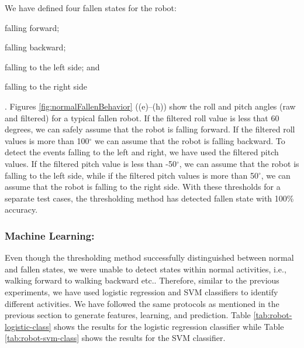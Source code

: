 \documentclass[letterpaper]{article}
\begin{document}
We have defined four fallen states for the robot: \begin{inparaenum}[(1)] \item falling
forward; \item falling backward; \item falling to the left side; and \item falling to the right
side\end{inparaenum}. Figures \ref{fig:normalFallenBehavior} ((e)--(h)) show the roll and pitch 
angles (raw and filtered) for a typical fallen robot. If the filtered roll value is less that 60 
degrees, we can safely assume that the robot is falling forward. If the filtered roll values is 
more than 100$^{\circ}$ we can assume that the robot is falling backward. To detect the events 
falling to the left and right, we have used the filtered pitch values. If the filtered pitch value 
is less than -50$^{\circ}$, we can assume that the robot is falling to the left side, while if the 
filtered pitch values is more than 50$^{\circ}$, we can assume that the robot is falling to the right 
side. With these thresholds for a separate test cases, the thresholding method has detected fallen 
state with 100\% accuracy. 

\subsubsection{Machine Learning:}
Even though the thresholding method successfully distinguished between normal and fallen states, we were 
unable to detect states within normal activities, i.e., walking forward to walking backward etc.. 
Therefore, similar to the previous experiments, we have used logistic regression and SVM 
classifiers to identify different activities. We have followed the same protocols as mentioned in 
the previous section to generate features, learning, and prediction. Table 
\ref{tab:robot-logistic-class} shows the results for the logistic regression classifier while 
Table \ref{tab:robot-svm-class} shows the results for the SVM classifier.    
\end{document}
